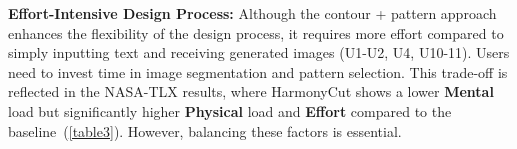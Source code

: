 \noindent\textbf{Effort-Intensive Design Process:} Although the contour + pattern approach enhances the flexibility of the design process, it requires more effort compared to simply inputting text and receiving generated images (U1-U2, U4, U10-11). Users need to invest time in image segmentation and pattern selection. This trade-off is reflected in the NASA-TLX results, where HarmonyCut shows a lower \textbf{Mental} load but significantly higher \textbf{Physical} load and \textbf{Effort} compared to the baseline~(\autoref{table3}). However, balancing these factors is essential.

